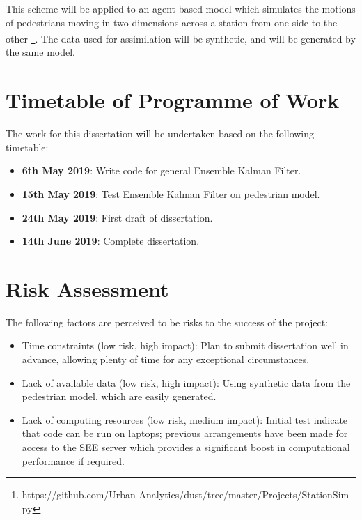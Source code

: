 \documentclass[12pt, twoside, a4paper]{article}
\begin{document}
This scheme will be applied to an agent-based model which simulates the motions
of pedestrians moving in two dimensions across a station from one side to the
other
\footnote{https://github.com/Urban-Analytics/dust/tree/master/Projects/StationSim-py}.
The data used for assimilation will be synthetic, and will be generated by the
same model.

\section{Timetable of Programme of Work}\label{sec:timetable}


The work for this dissertation will be undertaken based on the following
timetable:
\begin{itemize}
    \item \textbf{6th May 2019}: Write code for general Ensemble Kalman Filter.
    \item \textbf{15th May 2019}: Test Ensemble Kalman Filter on pedestrian model.
    \item \textbf{24th May 2019}: First draft of dissertation.
    \item \textbf{14th June 2019}: Complete dissertation.
\end{itemize}

\section{Risk Assessment}\label{sec:risk_ass}

The following factors are perceived to be risks to the success of the project:
\begin{itemize}
    \item Time constraints (low risk, high impact): Plan to submit dissertation well in
        advance, allowing plenty of time for any exceptional circumstances.
    \item Lack of available data (low risk, high impact): Using synthetic data
        from the pedestrian model, which are easily generated.
    \item Lack of computing resources (low risk, medium impact): Initial test
        indicate that code can be run on laptops; previous arrangements have
        been made for access to the SEE server which provides a significant
        boost in computational performance if required.
\end{itemize}




\end{document}
